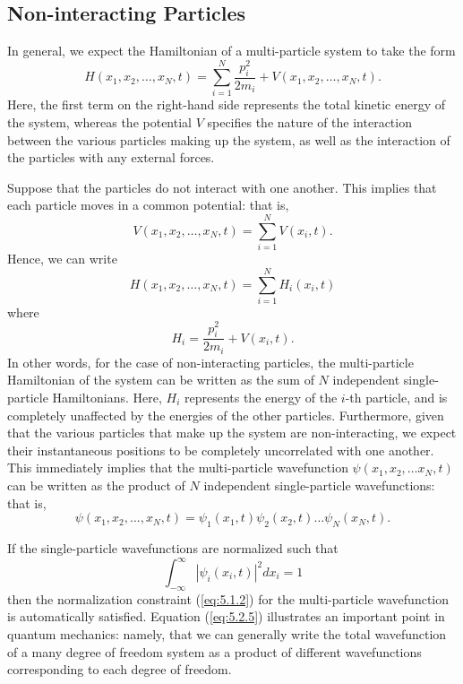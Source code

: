 \subsection{Non-interacting Particles}
\label{sec:5.2}

In general, we expect the Hamiltonian of a multi-particle system to take the form
\begin{equation}
	H(x_{1}, x_{2},\ldots, x_{N}, t) = \sum_{i=1}^{N}\frac{p_{i}^{2}}{2 m_{i}} + V(x_{1}, x_{2},\ldots, x_{N}, t).
	\label{eq:5.2.1}
\end{equation}
Here, the first term on the right-hand side represents the total kinetic energy of the system, whereas the potential $V$ specifies the nature of the interaction between the various particles making up the system, as well as the interaction of the particles with any external forces.

Suppose that the particles do not interact with one another. This implies that each particle moves in a common potential: that is,
\begin{equation}
	V(x_{1}, x_{2},\ldots, x_{N}, t) = \sum_{i=1}^{N} V(x_{i}, t).
	\label{eq:5.2.2}
\end{equation}
Hence, we can write
\begin{equation}
	H(x_{1}, x_{2},\ldots, x_{N}, t) = \sum_{i=1}^{N} H_{i}(x_{i}, t)
	\label{eq:5.2.3}
\end{equation}
where
\begin{equation}
	H_i = \frac{p_i^2}{2 m_i} + V(x_i, t).
	\label{eq:5.2.4}
\end{equation}
In other words, for the case of non-interacting particles, the multi-particle Hamiltonian of the system can be written as the sum of $N$ independent single-particle Hamiltonians. Here, $H_{i}$ represents the energy of the $i$-th particle, and is completely unaffected by the energies of the other particles. Furthermore, given that the various particles that make up the system are non-interacting, we expect their instantaneous positions to be completely uncorrelated with one another. This immediately implies that the multi-particle wavefunction $\psi(x_{1}, x_{2},\ldots x_{N}, t)$ can be written as the product of $N$ independent single-particle wavefunctions: that is,
\begin{equation}
	\psi(x_{1}, x_{2},\ldots, x_{N}, t) = \psi_{1}(x_{1}, t)\psi_{2}(x_{2}, t)\ldots\psi_{N}(x_{N}, t).
	\label{eq:5.2.5}
\end{equation}

If the single-particle wavefunctions are normalized such that
\begin{equation}
	\int_{-\infty}^{\infty}|\psi_{i}(x_{i}, t)|^{2} dx_{i} = 1
	\label{eq:5.2.6}
\end{equation}
then the normalization constraint (\ref{eq:5.1.2}) for the multi-particle wavefunction is automatically satisfied. Equation (\ref{eq:5.2.5}) illustrates an important point in quantum mechanics: namely, that we can generally write the total wavefunction of a many degree of freedom system as a product of different wavefunctions corresponding to each degree of freedom.


